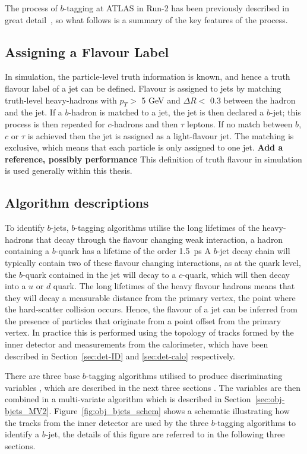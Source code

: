 The process of $b$-tagging at ATLAS in Run-2 has been previously described in great
detail~\cite{obj-bjets_algo_2015,obj-bjets_algo_2016},
so what follows is a summary of the key features of the process.

\subsection{Assigning a Flavour Label}
\label{sec:obj-bjets_label}

In simulation, the particle-level truth information is known, and hence a truth flavour label of a jet can be defined.
Flavour is assigned to jets by matching truth-level heavy-hadrons with $p_{T} >$ 5 GeV and $\Delta R <$ 0.3 between the hadron and the jet.
If a $b$-hadron is matched to a jet, the jet is then declared a $b$-jet;
this process is then repeated for $c$-hadrons and then $\tau$ leptons.
If no match between $b$, $c$ or $\tau$ is achieved then the jet is assigned as a light-flavour jet.
The matching is exclusive, which means that each particle is only assigned to one jet. \textbf{Add a reference, possibly performance}
This definition of truth flavour in simulation is used generally within this thesis.
   
\subsection{Algorithm descriptions}

To identify $b$-jets, $b$-tagging algorithms utilise the long lifetimes of the heavy-hadrons that decay through the flavour changing weak interaction,
a hadron containing a $b$-quark has a lifetime of the order \SI{1.5}{\pico\second} %
A $b$-jet decay chain  will typically contain two of these flavour changing interactions, 
as at the quark level, the $b$-quark contained in the jet will decay to a $c$-quark, which will then decay into a $u$ or $d$ quark.
The long lifetimes of the heavy flavour hadrons means that they will decay a measurable distance from the 
primary vertex, the point where the hard-scatter collision occurs.
Hence, the flavour of a jet can be inferred from the presence of particles
that originate from a point offset from the primary vertex.
In practice this is performed using the topology of tracks formed by the inner detector
and measurements from the calorimeter, which have been described in Section~\ref{sec:det-ID} and \ref{sec:det-calo} respectively.
   
There are three base $b$-tagging algorithms utilised to produce discriminating variables \cite{obj-bjets_algo_2016}, which are described in the next three sections .
The variables are then combined in a multi-variate algorithm which is described in Section~\ref{sec:obj-bjets_MV2}.
Figure~\ref{fig:obj_bjets_schem} shows a schematic illustrating how the tracks from the inner detector
are used by the three $b$-tagging algorithms to identify a $b$-jet, the details of this figure are referred to in the following three sections.

